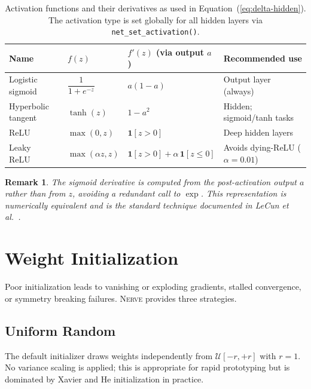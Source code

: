 \documentclass[11pt,a4paper]{article}
\newtheorem{remark}{Remark}[section]
\newcommand{\nerve}{\textsc{Nerve}}
\begin{document}
\begin{table}[H]
\centering
\caption{Activation functions and their derivatives as used in
  Equation~(\ref{eq:delta-hidden}). The activation type is set globally
  for all hidden layers via \texttt{net\_set\_activation()}.}
\label{tab:act}
\renewcommand{\arraystretch}{1.35}
\begin{tabular}{@{}llll@{}}
\toprule
Name & $f(z)$ & $f'(z)$ (via output $a$) & Recommended use \\
\midrule
Logistic sigmoid
  & $\dfrac{1}{1+e^{-z}}$
  & $a(1-a)$
  & Output layer (always) \\[8pt]
Hyperbolic tangent
  & $\tanh(z)$
  & $1 - a^2$
  & Hidden; sigmoid/tanh tasks \\[4pt]
ReLU~\cite{nair2010}
  & $\max(0,z)$
  & $\mathbf{1}[z>0]$
  & Deep hidden layers \\[4pt]
Leaky ReLU~\cite{maas2013}
  & $\max(\alpha z,z)$
  & $\mathbf{1}[z>0]+\alpha\,\mathbf{1}[z\leq 0]$
  & Avoids dying-ReLU ($\alpha{=}0.01$) \\
\bottomrule
\end{tabular}
\end{table}

\begin{remark}
The sigmoid derivative is computed from the post-activation output $a$ rather
than from $z$, avoiding a redundant call to $\exp$. This representation is
numerically equivalent and is the standard technique documented in
LeCun et al.~\cite{lecun1998}.
\end{remark}

\section{Weight Initialization}
\label{sec:init}

Poor initialization leads to vanishing or exploding gradients, stalled
convergence, or symmetry breaking failures. \nerve{} provides three
strategies.

\subsection{Uniform Random}

The default initializer draws weights independently from
$\mathcal{U}[-r,+r]$ with $r=1$. No variance scaling is applied;
this is appropriate for rapid prototyping but is dominated by
Xavier and He initialization in practice.
\end{document}
